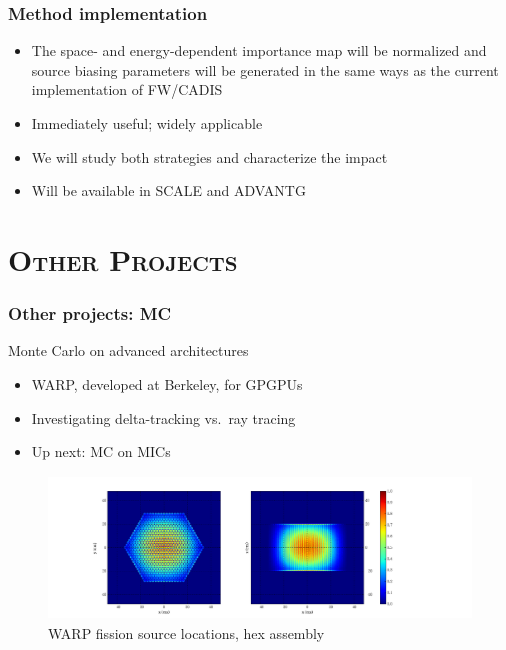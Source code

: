 \documentclass[xcolor=x11names,compress, handout]{beamer}
\renewcommand{\(}{\begin{columns}}
\renewcommand{\)}{\end{columns}}
\newcommand{\<}[1]{\begin{column}{#1}}
\renewcommand{\>}{\end{column}}
\begin{document}
\begin{frame}[fragile]
  \frametitle{Method implementation}

  	\begin{itemize}
    \item The space- and energy-dependent importance map will be normalized and 
     source biasing parameters will be generated in the \alert{same ways} as
     the current implementation of FW/CADIS \vspace*{1 em}
	\item Immediately useful; widely applicable \vspace*{1 em}
	\item We will study both strategies and characterize the impact\vspace*{1 em}
	\item Will be available in SCALE \cite{SCALE} and ADVANTG \cite{Pantelias2013}
	\end{itemize}
	
\end{frame}


\section{\scshape Other Projects}
\begin{frame}[fragile]
  \frametitle{Other projects: MC}
  
Monte Carlo on advanced architectures

  	\begin{itemize}
  	\item WARP, developed at Berkeley, for GPGPUs
  	\item Investigating delta-tracking vs.\ ray tracing
  	\item Up next: MC on MICs
	\end{itemize}	
	\begin{center}
 	 \begin{figure}
 	 \includegraphics[height=1.5in,clip]{assembly-fiss-6}  
 	 \caption{WARP fission source locations, hex assembly}
 	 \end{figure}
 	\end{center}
  
\end{frame}	
\end{document}
